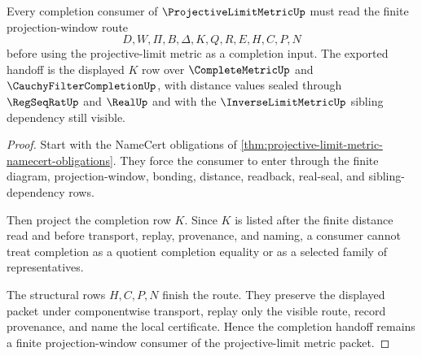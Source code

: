\begin{theorem}
\label{thm:projective-limit-metric-completion-handoff}
Every completion consumer of $\ProjectiveLimitMetricUp$ must read the finite projection-window route
$$
D,W,\Pi,B,\Delta,K,Q,R,E,H,C,P,N
$$
before using the projective-limit metric as a completion input. The exported handoff is the displayed $K$ row over $\CompleteMetricUp$ and $\CauchyFilterCompletionUp$, with distance values sealed through $\RegSeqRatUp$ and $\RealUp$ and with the $\InverseLimitMetricUp$ sibling dependency still visible.
\end{theorem}
\begin{proof}
Start with the NameCert obligations of \autoref{thm:projective-limit-metric-namecert-obligations}. They force the consumer to enter through the finite diagram, projection-window, bonding, distance, readback, real-seal, and sibling-dependency rows.

Then project the completion row $K$. Since $K$ is listed after the finite distance read and before transport, replay, provenance, and naming, a consumer cannot treat completion as a quotient completion equality or as a selected family of representatives.

The structural rows $H,C,P,N$ finish the route. They preserve the displayed packet under componentwise transport, replay only the visible route, record provenance, and name the local certificate. Hence the completion handoff remains a finite projection-window consumer of the projective-limit metric packet.
\end{proof}


\begin{closurestatus}{\ProjectiveLimitMetricUp}
  \theoryclosure{\seedClosure}
  \formalstatus{\unformalizedV}
\end{closurestatus}
